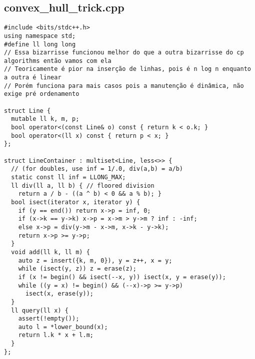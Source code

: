 \documentclass[11pt,landscape,twocolumn]{article}
\begin{document}
\subsection*{convex\_hull\_trick.cpp}
\begin{lstlisting}
#include <bits/stdc++.h>
using namespace std;
#define ll long long
// Essa bizarrisse funcionou melhor do que a outra bizarrisse do cp algorithms então vamos com ela
// Teoricamente é pior na inserção de linhas, pois é n log n enquanto a outra é linear
// Porém funciona para mais casos pois a manutenção é dinâmica, não exige pré ordenamento

struct Line {
  mutable ll k, m, p;
  bool operator<(const Line& o) const { return k < o.k; }
  bool operator<(ll x) const { return p < x; }
};

struct LineContainer : multiset<Line, less<>> {
  // (for doubles, use inf = 1/.0, div(a,b) = a/b)
  static const ll inf = LLONG_MAX;
  ll div(ll a, ll b) { // floored division
    return a / b - ((a ^ b) < 0 && a % b); }
  bool isect(iterator x, iterator y) {
    if (y == end()) return x->p = inf, 0;
    if (x->k == y->k) x->p = x->m > y->m ? inf : -inf;
    else x->p = div(y->m - x->m, x->k - y->k);
    return x->p >= y->p;
  }
  void add(ll k, ll m) {
    auto z = insert({k, m, 0}), y = z++, x = y;
    while (isect(y, z)) z = erase(z);
    if (x != begin() && isect(--x, y)) isect(x, y = erase(y));
    while ((y = x) != begin() && (--x)->p >= y->p)
      isect(x, erase(y));
  }
  ll query(ll x) {
    assert(!empty());
    auto l = *lower_bound(x);
    return l.k * x + l.m;
  }
};
\end{lstlisting}
\end{document}
